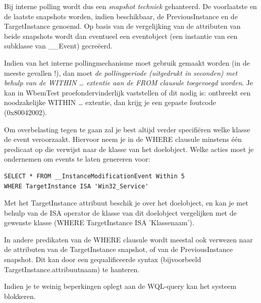 \documentclass[11pt,a4paper]{report}
\begin{document}
\par Bij interne polling wordt dus een \textit{snapshot techniek} gehanteerd. De voorlaatste en de laatste snapshots worden, indien beschikbaar, de PreviousInstance en de TargetInstance genoemd. Op basis van de vergelijking van de attributen van beide snapshots wordt dan eventueel een eventobject (een instantie van een subklasse van \_\_Event) gecreëerd.
\par Indien van het interne pollingmechanisme moet gebruik gemaakt worden (in de meeste gevallen !), dan moet \textit{de pollingperiode (uitgedrukt in seconden) met behulp van de WITHIN … extentie aan de FROM clausule toegevoegd worden}. Je kan in WbemTest proefondervinderlijk vaststellen of dit nodig is: ontbreekt een noodzakelijke WITHIN … extentie, dan krijg je een gepaste foutcode (0x80042002).
\par Om overbelasting tegen te gaan zal je best altijd verder specifiëren welke klasse de event veroorzaakt. Hiervoor neem je in de WHERE clausule minstens één predicaat op die verwijst naar de klasse van het doelobject. Welke acties moet je ondernemen om events te laten genereren voor:
\begin{lstlisting}
SELECT * FROM __InstanceModificationEvent Within 5
WHERE TargetInstance ISA 'Win32_Service'
\end{lstlisting}
Met het TargetInstance attribuut beschik je over het doelobject, en kan je met behulp van de ISA operator de klasse van dit doelobject vergelijken met de gewenste klasse (WHERE TargetInstance ISA 'Klassenaam').
\par In andere predikaten van de WHERE clausule wordt meestal ook verwezen naar de attributen van de TargetInstance snapshot, of van de PreviousInstance snapshot. Dit kan door een gequalificeerde syntax (bijvoorbeeld TargetInstance.attribuutnaam) te hanteren.
\par Indien je te weinig beperkingen oplegt aan de WQL-query kan het systeem blokkeren.
\end{document}
